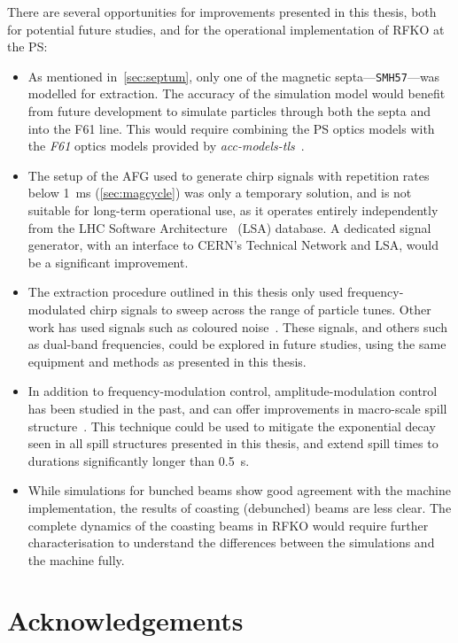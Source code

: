 \documentclass[a4paper,twoside,11pt]{report}
\begin{document}
There are several opportunities for improvements presented in this thesis, both for potential future studies, and for the operational implementation of RFKO at the PS:
\begin{itemize}
  \item As mentioned in~\autoref{sec:septum}, only one of the magnetic septa---\verb|SMH57|---was modelled for extraction. The accuracy of the simulation model would benefit from future development to simulate particles through both the septa and into the F61 line. This would require combining the PS optics models with the \textit{F61} optics models provided by \textit{acc-models-tls}~\cite{optics_repo}.
  \item The setup of the AFG used to generate chirp signals with repetition rates below \qty{1}{\milli\second} (\autoref{sec:magcycle}) was only a temporary solution, and is not suitable for long-term operational use, as it operates entirely independently from the LHC Software Architecture~\cite{Roderick:1215575} (LSA) database. A dedicated signal generator, with an interface to CERN's Technical Network and LSA, would be a significant improvement.
  \item The extraction procedure outlined in this thesis only used frequency-modulated chirp signals to sweep across the range of particle tunes. Other work has used signals such as coloured noise~\cite{Nagaslaev:2011zz}. These signals, and others such as dual-band frequencies, could be explored in future studies, using the same equipment and methods as presented in this thesis.
  \item In addition to frequency-modulation control, amplitude-modulation control has been studied in the past, and can offer improvements in macro-scale spill structure~\cite{NODA2002241}. This technique could be used to mitigate the exponential decay seen in all spill structures presented in this thesis, and extend spill times to durations significantly longer than \qty{0.5}{\second}.
  \item While simulations for bunched beams show good agreement with the machine implementation, the results of coasting (debunched) beams are less clear. The complete dynamics of the coasting beams in RFKO would require further characterisation to understand the differences between the simulations and the machine fully.
\end{itemize}


\chapter{Acknowledgements}

%  

 
\end{document}
